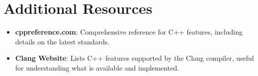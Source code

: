 \documentclass{article}
\begin{document}
\section*{Additional Resources}

\begin{itemize}
    \item \textbf{cppreference.com}:
    Comprehensive reference for C++ features, including details on the latest standards.

    \item \textbf{Clang Website}:
    Lists C++ features supported by the Clang compiler, useful for understanding what is available and implemented.
\end{itemize}
\end{document}
